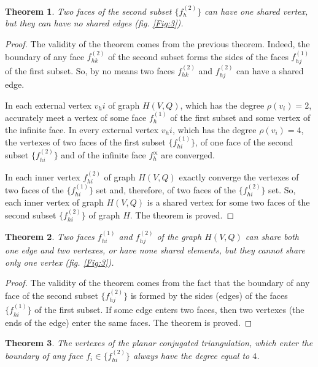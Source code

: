 \documentclass{amsart}
\newtheorem{theorem}{Theorem}
\theoremstyle{plain}
\numberwithin{equation}{section}
\begin{document}
\begin{theorem}
Two faces of the second subset $\{f_h^{(2)}\}$ can have one shared vertex, but they can have no shared edges (fig. \ref{Fig:3}).
\end {theorem}

\begin {proof}
The validity of the theorem comes from the previous theorem. Indeed, the boundary of any face $f_{hk}^{(2)}$ of the second subset forms the sides of the faces $f_{hj}^{(1)}$ of the first subset. So, by no means two faces $f_{hk}^{(2)}$ and $f_{hj}^{(2)}$ can have a shared edge.

In each external vertex $v_hi$ of graph $H(V,Q)$, which has the degree $\rho(v_i )=2$, accurately meet a vertex of some face $f_h^{(1)}$ of the first subset and some vertex of the infinite face. In every external vertex $v_hi$, which has the degree $\rho(v_i )=4$, the vertexes of two faces of the first subset $\{f_{hi}^{(1)}\}$, of one face of the second subset $\{f_{hi}^{(2)}\}$ and of the infinite face $f_h^{\propto}$ are converged.

In each inner vertex $f_{hi}^{(2)}$ of graph $H(V,Q)$ exactly converge the vertexes of two faces of the $\{f_{hi}^{(1)}\}$ set and, therefore, of two faces of the $\{f_{hi}^{(2)}\}$ set. So, each inner vertex of graph $H(V,Q)$ is a shared vertex for some two faces of the second subset $\{f_{hi}^{(2)}\}$ of graph $H$. The theorem is proved.
\end {proof}

\begin{theorem}
Two faces $f_{hi}^{(1)}$ and $f_{hj}^{(2)}$ of the graph $H(V,Q)$ can share both one edge and two vertexes, or have none shared elements, but they cannot share only one vertex (fig. \ref{Fig:3}).
\end {theorem}

\begin {proof}
The validity of the theorem comes from the fact that the boundary of any face of the second subset $\{f_{hj}^{(2)}\}$ is formed by the sides (edges) of the faces $\{f_{hi}^{(1)}\}$ of the first subset. If some edge enters two faces, then two vertexes (the ends of the edge) enter the same faces. The theorem is proved.
\end {proof}

\begin{theorem}
The vertexes of the planar conjugated triangulation, which enter the boundary of any face $f_i \in \{f_{hi}^{(2)}\}$ always have the degree equal to $4$.
\end {theorem}
\end{document}
